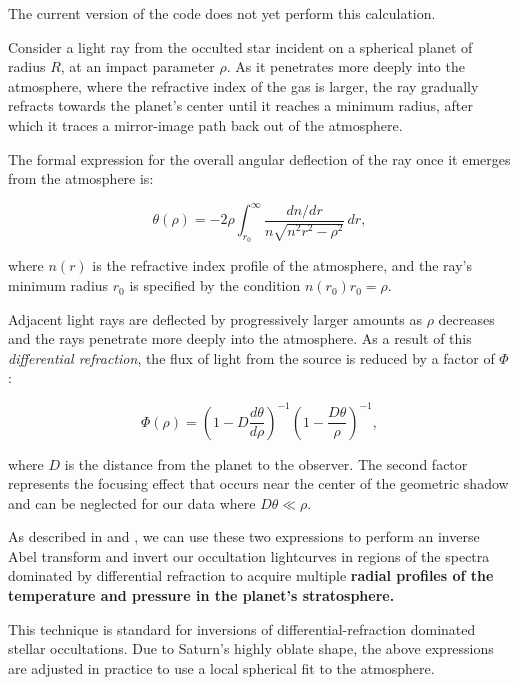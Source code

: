 \documentclass[12pt]{article}
\begin{document}
The current version of the code does not yet perform this calculation.

Consider a light ray from the occulted star incident on a spherical planet of
radius $R$, at an impact parameter $\rho$. As it penetrates more deeply into
the atmosphere, where the refractive index of the gas is larger, the ray
gradually refracts towards the planet's center until it reaches a minimum
radius, after which it traces a mirror-image path back out of the atmosphere.

The formal expression for the overall angular deflection of the ray once it
emerges from the atmosphere is:

\begin{equation}
 \theta(\rho) = -2\rho \int_{r_0}^\infty \frac{dn/dr}{n\sqrt{n^2r^2 - \rho^2}}\, dr,
\end{equation}

\noindent where $n(r)$  is the refractive index profile of the atmosphere,
and the ray's minimum radius $r_0$ is specified by the condition $n(r_0)r_0 = \rho$.

Adjacent light rays are deflected by progressively larger amounts as $\rho$
decreases and the rays penetrate more deeply into the atmosphere. As a result
of this {\it differential refraction}, the flux of light from the source is
reduced by a factor of $\Phi$:

\begin{equation}
 \Phi(\rho) = \left( 1 - D\frac{d\theta}{d\rho} \right)^{-1}\left( 1 - \frac{D\theta}{\rho} \right)^{-1},
\label{eq:iso_flux}
\end{equation}

\noindent where $D$ is the distance from the planet to the observer. The second
factor represents the focusing effect that occurs near the center of the
geometric shadow and can be neglected for our data where $D\theta\ll\rho$.

As described in \cite{Elliot77} and \cite{French78}, we can use these two
expressions to perform an inverse Abel transform and invert our occultation
lightcurves in regions of the spectra dominated by differential refraction to
acquire multiple {\bf radial profiles of the temperature and pressure in the
planet's stratosphere.}

This technique is standard for inversions of differential-refraction dominated
stellar occultations.  Due to Saturn's highly oblate shape, the above
expressions are adjusted in practice to use a local spherical fit to the
atmosphere.
\end{document}
